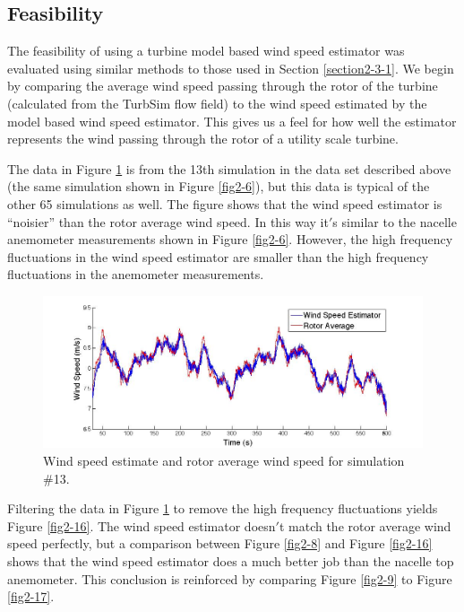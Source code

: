 \subsection{Feasibility} \label{section2-4-1} 

The feasibility of using a turbine model based wind speed estimator was evaluated using similar methods to those used in Section \ref{section2-3-1}. We begin by comparing the average wind speed passing through the rotor of the turbine (calculated from the TurbSim flow field) to the wind speed estimated by the model based wind speed estimator.  This gives us a feel for how well the estimator represents the wind passing through the rotor of a utility scale turbine.

The data in Figure \ref{fig2-15} is from the 13th simulation in the data set described above (the same simulation shown in Figure \ref{fig2-6}), but this data is typical of the other 65 simulations as well. The figure shows that the wind speed estimator is ``noisier'' than the rotor average wind speed. In this way it$'$s similar to the nacelle anemometer measurements shown in Figure \ref{fig2-6}. However, the high frequency fluctuations in the wind speed estimator are smaller than the high frequency fluctuations in the anemometer measurements. 

\begin{figure}[htbp]
	\centering
		\includegraphics[width = \linewidth]{Figures/ch2Figures/fig2-15.jpg}
		
	\caption{Wind speed estimate and rotor average wind speed for simulation \#13.}
	\label{fig2-15}
\end{figure}


Filtering the data in Figure \ref{fig2-15} to remove the high frequency fluctuations yields Figure \ref{fig2-16}. The wind speed estimator doesn$'$t match the rotor average wind speed perfectly, but a comparison between Figure \ref{fig2-8} and Figure \ref{fig2-16} shows that the wind speed estimator does a much better job than the nacelle top anemometer. This conclusion is reinforced by comparing Figure \ref{fig2-9} to Figure \ref{fig2-17}.

